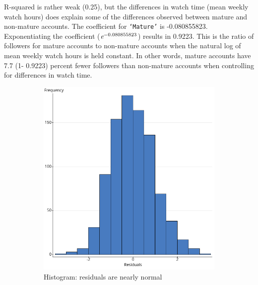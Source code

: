 \documentclass[12pt]{article}
\begin{document}
R-squared is rather weak (0.25), but the differences in watch time (mean weekly watch hours) does explain some of the differences observed between mature and non-mature accounts. The coefficient for \texttt{`Mature'} is -0.080855823. Exponentiating the coefficient ($\emph{e}^{-0.080855823}$) results in 0.9223. This is the ratio of followers for mature accounts to non-mature accounts when the natural log of mean weekly watch hours is held constant. In other words, mature accounts have 7.7 (1- 0.9223) percent fewer followers than non-mature accounts when controlling for differences in watch time.

\begin{figure}
    \centering
    \begin{subfigure}{0.45\textwidth}
        \centering
        \includegraphics[width=\textwidth]{../StatCrunch_Results/followers_mature_watch_hrs/residual_histogram}
        \caption{Histogram: residuals are nearly normal}
        \label{fig:plot1}
    \end{subfigure}
    \hfill
    \begin{subfigure}{0.45\textwidth}
        \centering

\end{subfigure}
\end{figure}
\end{document}
